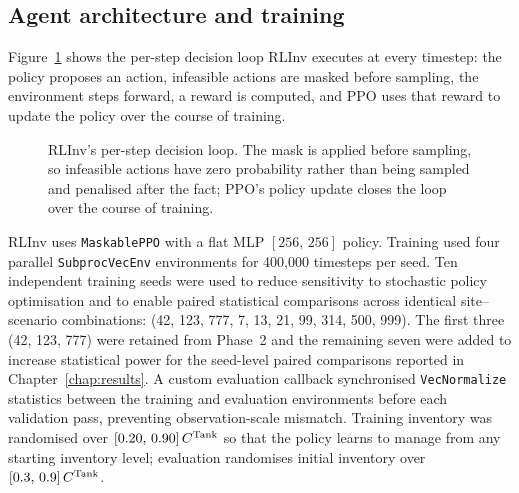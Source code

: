 \subsection{Agent architecture and training}

Figure~\ref{fig:rlinv_loop} shows the per-step decision loop RLInv
executes at every timestep: the policy proposes an action, infeasible
actions are masked before sampling, the environment steps forward, a
reward is computed, and PPO uses that reward to update the policy over
the course of training.

\begin{figure}[htbp]
\centering
{}
\caption{RLInv's per-step decision loop. The mask is applied before
sampling, so infeasible actions have zero probability rather than being
sampled and penalised after the fact; PPO's policy update closes the
loop over the course of training.}
\label{fig:rlinv_loop}
\end{figure}

RLInv uses \texttt{MaskablePPO} with a flat MLP $[256,\,256]$ policy.
Training used four parallel \texttt{SubprocVecEnv} environments for
400{,}000 timesteps per seed. Ten independent training seeds were used
to reduce sensitivity to stochastic policy optimisation and to enable
paired statistical comparisons across identical site--scenario
combinations: (42, 123, 777, 7, 13, 21, 99, 314, 500, 999). The first
three (42, 123, 777) were retained from Phase~2 and the
remaining seven were added to increase statistical power for the
seed-level paired comparisons reported in Chapter~\ref{chap:results}. A custom evaluation callback synchronised
\texttt{VecNormalize} statistics between the training and evaluation
environments before each validation pass, preventing observation-scale
mismatch. Training inventory was randomised over $[0.20,\,0.90]\,C^{\mathrm{Tank}}$
so that the policy learns to manage from any starting inventory level;
evaluation randomises initial inventory over $[0.3,\,0.9]\,C^{\mathrm{Tank}}$.

